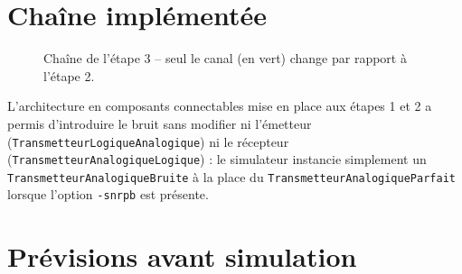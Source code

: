 \documentclass[11pt,a4paper]{article}
\begin{document}
\section{Chaîne implémentée}
\begin{figure}[h]\centering
{}
\caption{Chaîne de l'étape 3 -- seul le canal (en vert) change par rapport à l'étape 2.}
\end{figure}
L'architecture en composants connectables mise en place aux étapes 1 et 2 a permis d'introduire le bruit sans modifier ni l'émetteur (\texttt{TransmetteurLogiqueAnalogique}) ni le récepteur (\texttt{TransmetteurAnalogiqueLogique}) : le simulateur instancie simplement un \texttt{TransmetteurAnalogiqueBruite} à la place du \texttt{TransmetteurAnalogiqueParfait} lorsque l'option \texttt{-snrpb} est présente.

\section{Prévisions avant simulation}
\end{document}
